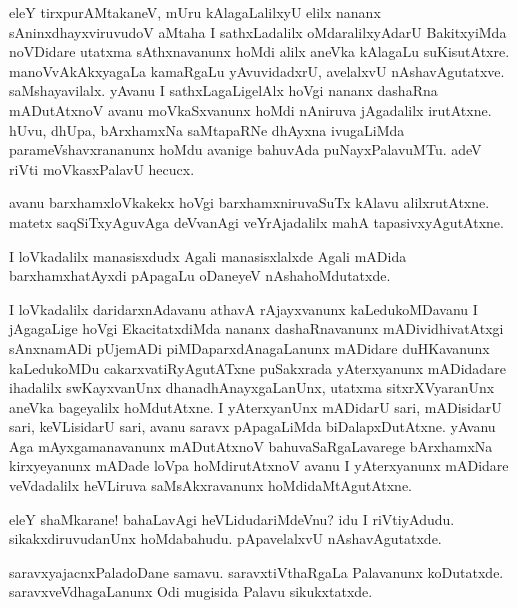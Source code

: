 \begin{mng}
eleY tirxpurAMtakaneV, mUru kAlagaLalilxyU elilx nananx sAninxdhayxviruvudoV aMtaha I sathxLadalilx oMdaralilxyAdarU BakitxyiMda noVDidare utatxma sAthxnavanunx hoMdi alilx aneVka kAlagaLu suKisutAtxre. manoVvAkAkxyagaLa kamaRgaLu yAvuvidadxrU, avelalxvU nAshavAgutatxve. saMshayavilalx. yAvanu I sathxLagaLigelAlx hoVgi nananx dashaRna mADutAtxnoV avanu moVkaSxvanunx hoMdi nAniruva jAgadalilx irutAtxne. hUvu, dhUpa, bArxhamxNa saMtapaRNe dhAyxna ivugaLiMda parameVshavxrananunx hoMdu avanige bahuvAda puNayxPalavuMTu. adeV riVti moVkasxPalavU hecucx.
\end{mng}

\begin{mng}
avanu barxhamxloVkakekx hoVgi barxhamxniruvaSuTx kAlavu alilxrutAtxne. matetx saqSiTxyAguvAga deVvanAgi veYrAjadalilx mahA tapasivxyAgutAtxne.
\end{mng}

\begin{mng}
I loVkadalilx manasisxdudx Agali manasisxlalxde Agali mADida barxhamxhatAyxdi pApagaLu oDaneyeV nAshahoMdutatxde.
\end{mng}

\begin{mng}
I loVkadalilx daridarxnAdavanu athavA rAjayxvanunx kaLedukoMDavanu I jAgagaLige hoVgi EkacitatxdiMda nananx dashaRnavanunx mADividhivatAtxgi sAnxnamADi pUjemADi piMDaparxdAnagaLanunx mADidare duHKavanunx kaLedukoMDu cakarxvatiRyAgutATxne puSakxrada yAterxyanunx mADidadare ihadalilx swKayxvanUnx dhanadhAnayxgaLanUnx, utatxma sitxrXVyaranUnx aneVka bageyalilx hoMdutAtxne. I yAterxyanUnx mADidarU sari, mADisidarU sari, keVLisidarU sari, avanu saravx pApagaLiMda biDalapxDutAtxne. yAvanu Aga mAyxgamanavanunx mADutAtxnoV bahuvaSaRgaLavarege bArxhamxNa kirxyeyanunx mADade loVpa hoMdirutAtxnoV avanu I yAterxyanunx mADidare veVdadalilx heVLiruva saMsAkxravanunx hoMdidaMtAgutAtxne.
\end{mng}

\begin{mng}
eleY shaMkarane! bahaLavAgi heVLidudariMdeVnu? idu I riVtiyAdudu. sikakxdiruvudanUnx hoMdabahudu. pApavelalxvU nAshavAgutatxde.
\end{mng}

\begin{mng}
saravxyajacnxPaladoDane samavu. saravxtiVthaRgaLa Palavanunx koDutatxde. saravxveVdhagaLanunx Odi mugisida Palavu sikukxtatxde.
\end{mng}

